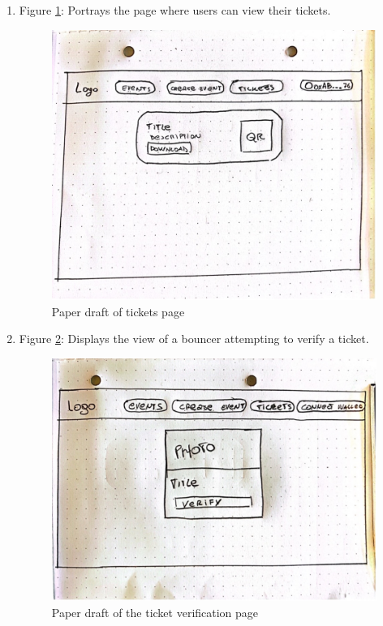 \begin{enumerate}
    \item Figure \ref{Abb5}: Portrays the page where users can view their tickets.\\
    \begin{figure}[H]
    \centering
    \includegraphics[width=1\linewidth]{PICs/Picture3.jpg}
    \caption{Paper draft of tickets page}\label{Abb5}
    \end{figure}
    
    \item Figure \ref{Abb6}: Displays the view of a bouncer attempting to verify a ticket.\\
    \begin{figure}[H]
    \centering
    \includegraphics[width=1\linewidth]{PICs/Picture4.jpg}
    \caption{Paper draft of the ticket verification page}\label{Abb6}
    \end{figure}
\end{enumerate}

